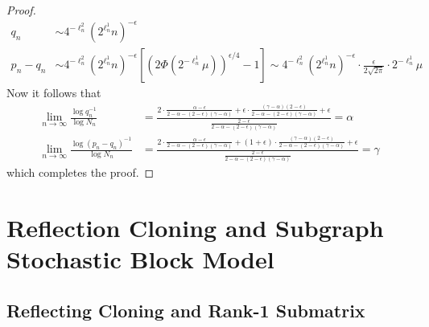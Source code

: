 \begin{proof}
\begin{align*}
q_n &\sim 4^{-\ell_n^2} \left( 2^{\ell^1_n} n \right)^{-\epsilon} \\
p_n - q_n &\sim 4^{-\ell_n^2} \left( 2^{\ell^1_n} n \right)^{-\epsilon} \left[ \left( 2\Phi\left( 2^{-\ell_n^1} \mu \right) \right)^{\epsilon/4} - 1\right] \sim 4^{-\ell_n^2} \left( 2^{\ell^1_n} n \right)^{-\epsilon} \cdot \frac{\epsilon}{2 \sqrt{2\pi}} \cdot 2^{-\ell^1_n} \mu
\end{align*}
Now it follows that
\begin{align*}
\lim_{n \to \infty} \frac{\log q_n^{-1}}{\log N_n} &= \frac{2 \cdot \frac{\alpha - \epsilon}{2 - \alpha - (2 - \epsilon) ( \gamma - \alpha)} + \epsilon \cdot \frac{(\gamma - \alpha)(2 - \epsilon)}{2 - \alpha - (2 - \epsilon) ( \gamma - \alpha)} + \epsilon}{\frac{2 - \epsilon}{2 - \alpha - (2 - \epsilon) ( \gamma - \alpha)}} = \alpha \\
\lim_{n \to \infty} \frac{\log (p_n - q_n)^{-1}}{\log N_n} &= \frac{2 \cdot \frac{\alpha - \epsilon}{2 - \alpha - (2 - \epsilon) ( \gamma - \alpha)} + (1 + \epsilon) \cdot \frac{(\gamma - \alpha)(2 - \epsilon)}{2 - \alpha - (2 - \epsilon) ( \gamma - \alpha)} + \epsilon}{\frac{2 - \epsilon}{2 - \alpha - (2 - \epsilon) ( \gamma - \alpha)}} = \gamma
\end{align*}
which completes the proof.
\end{proof}

\section{Reflection Cloning and Subgraph Stochastic Block Model}

\label{s:reflection}

\subsection{Reflecting Cloning and Rank-1 Submatrix}

